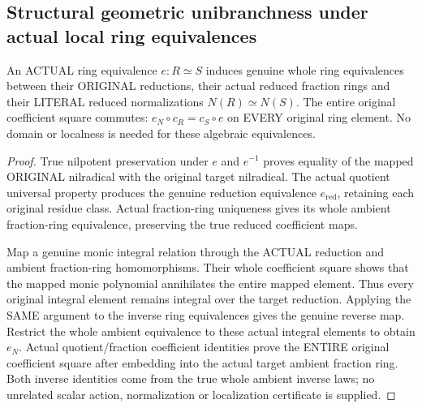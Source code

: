 \subsection{Structural geometric unibranchness under actual local ring equivalences}

\begin{theorem}
\label{algebra:actual-unibranch-normalization-ring-equivalence}
An ACTUAL ring equivalence $e:R\simeq S$ induces genuine whole ring
equivalences between their ORIGINAL reductions, their actual reduced
fraction rings and their LITERAL reduced normalizations $N(R)\simeq N(S)$.
The entire original coefficient square commutes:
$e_N\circ c_R=c_S\circ e$ on EVERY original ring element.
No domain or localness is needed for these algebraic equivalences.
\leanok
\end{theorem}
\begin{proof}
True nilpotent preservation under $e$ and $e^{-1}$ proves equality of
the mapped ORIGINAL nilradical with the original target nilradical.
The actual quotient universal property produces the genuine reduction
equivalence $e_{\mathrm{red}}$, retaining each original residue class.
Actual fraction-ring uniqueness gives its whole ambient fraction-ring
equivalence, preserving the true reduced coefficient maps.

Map a genuine monic integral relation through the ACTUAL reduction
and ambient fraction-ring homomorphisms. Their whole coefficient square
shows that the mapped monic polynomial annihilates the entire mapped
element. Thus every original integral element remains integral over
the target reduction. Applying the SAME argument to the inverse
ring equivalences gives the genuine reverse map. Restrict the whole
ambient equivalence to these actual integral elements to obtain
$e_N$. Actual quotient/fraction coefficient identities prove the
ENTIRE original coefficient square after embedding into the actual
target ambient fraction ring. Both inverse identities come from the
true whole ambient inverse laws; no unrelated scalar action,
normalization or localization certificate is supplied.
\end{proof}

